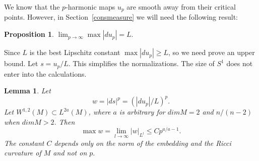 \documentclass{ip-journal}
\newtheorem{lemma}[theorem]{Lemma}
\newtheorem{proposition}[theorem]{Proposition}
\theoremstyle{definition}
\numberwithin{equation}{section}
\begin{document}
We know that the $p$-harmonic maps $u_p$ are smooth away from their critical points.  However, in Section~\ref{consmeasure} we will need the following result:

\begin{proposition}\label{maxest}  $\lim_{p \rightarrow \infty} \max |du_p| = L.$
\end{proposition}

Since $L$ is the best Lipschitz constant $\max |du_p| \geq L$, so we need prove an upper bound.
Let $s = u_p/L.$   This simplifies the normalizations.  The size of $S^1$ does not enter into the calculations. %

\begin{lemma} Let 
\[
w = |ds|^p = (|du_p|/L)^p.
\] 
Let $W^{1,2} (M) \subset L^{2a}(M)$, where $a$ is arbitrary for $dim M = 2$ and $n/(n-2)$ when $dim M > 2$.  Then
\[
     \max w = \lim_{l \rightarrow \infty} |w|_{L^l}  \leq Cp^{a/a-1}. 
\]
The constant $C$ depends only on the norm of the embedding and the Ricci curvature of $M$ and not on $p.$
\end{lemma}
\end{document}
